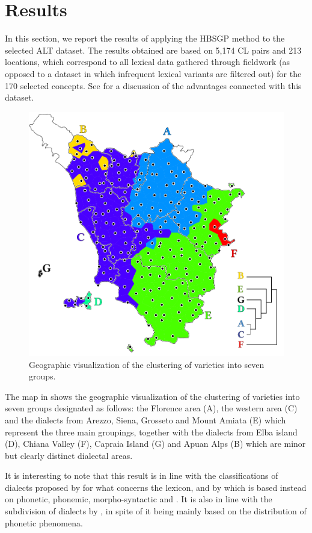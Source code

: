 \documentclass[output=paper]{LSP/langsci}
\begin{document}
\section{Results}
In this section, we report the results of applying the HBSGP method to the selected ALT dataset. The results obtained are based on 5,174 CL pairs and 213 locations, which correspond to all lexical data gathered through fieldwork (as opposed to a dataset in which infrequent lexical variants are filtered out) for the 170 selected concepts. See \citet{wieling_infrequent_2015} for a discussion of the advantages connected with this dataset. 

\begin{figure}[b]
\includegraphics[width=.8\textwidth]{illustrations/monte_wiel_fig1_v2} 
\caption{Geographic visualization of the clustering of  varieties into seven groups.} 
\label{fig:monte:1}
\end{figure}

The map in  shows the geographic visualization of the clustering of  varieties into seven groups designated as follows: the Florence area (A), the western  area (C) and the dialects from Arezzo, Siena, Grosseto and Mount Amiata (E) which represent the three main groupings, together with the dialects from Elba island (D), Chiana Valley (F), Capraia Island (G) and Apuan Alps (B) which are minor but clearly distinct dialectal areas.



It is interesting to note that this result is in line with the classifications of  dialects proposed by \citet{giacomelli_aree_1975} for what concerns the lexicon, and by \citet{giannelli_toscana_1976} which is based instead on phonetic, phonemic, morpho-syntactic and . It is also in line with the subdivision of  dialects by \citet{pellegrini_carta_1977}, in spite of it being mainly based on the distribution of phonetic phenomena.
\end{document}
